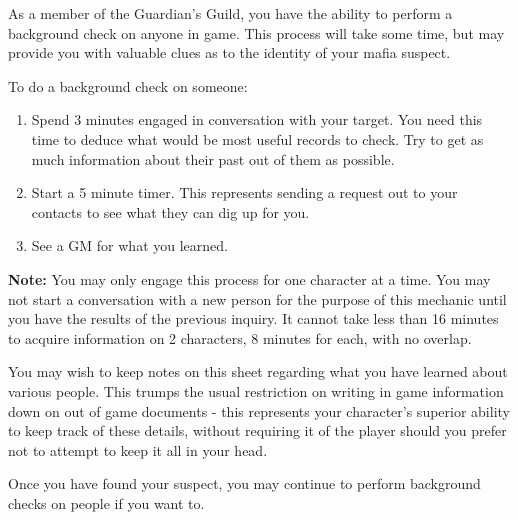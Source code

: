 \documentclass[green]{NeptuneBall}
\begin{document}
\name{\gBackground{}}

As a member of the Guardian's Guild, you have the ability to perform a background check on anyone in game. This process will take some time, but may provide you with valuable clues as to the identity of your mafia suspect.

To do a background check on someone:
\begin{enumerate}
\item Spend 3 minutes engaged in conversation with your target. You need this time to deduce what would be most useful records to check. Try to get as much information about their past out of them as possible.
\item Start a 5 minute timer. This represents sending a request out to your contacts to see what they can dig up for you.
\item See a GM for what you learned.
\end{enumerate}

\textbf{Note:} You may only engage this process for one character at a time. You may not start a conversation with a new person for the purpose of this mechanic until you have the results of the previous inquiry. It cannot take less than 16 minutes to acquire information on 2 characters, 8 minutes for each, with no overlap.

You may wish to keep notes on this sheet regarding what you have learned about various people. This trumps the usual restriction on writing in game information down on out of game documents - this represents your character's superior ability to keep track of these details, without requiring it of the player should you prefer not to attempt to keep it all in your head.

Once you have found your suspect, you may continue to perform background checks on people if you want to.
\end{document}
